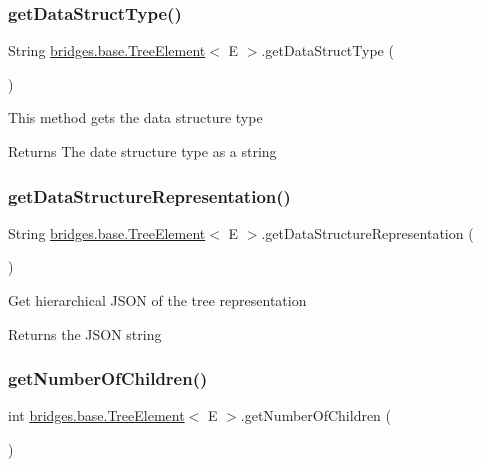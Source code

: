 \subsubsection{\texorpdfstring{getDataStructType()}{getDataStructType()}}
{\footnotesize\ttfamily String \mbox{\hyperlink{classbridges_1_1base_1_1_tree_element}{bridges.\+base.\+Tree\+Element}}$<$ E $>$.get\+Data\+Struct\+Type (\begin{DoxyParamCaption}{ }\end{DoxyParamCaption})}

This method gets the data structure type

\begin{DoxyReturn}{Returns}
The date structure type as a string 
\end{DoxyReturn}
\mbox{\label{classbridges_1_1base_1_1_tree_element_a674870c91b39fac88d35a569fd505e9b}} 
\subsubsection{\texorpdfstring{getDataStructureRepresentation()}{getDataStructureRepresentation()}}
{\footnotesize\ttfamily String \mbox{\hyperlink{classbridges_1_1base_1_1_tree_element}{bridges.\+base.\+Tree\+Element}}$<$ E $>$.get\+Data\+Structure\+Representation (\begin{DoxyParamCaption}{ }\end{DoxyParamCaption})}

Get hierarchical J\+S\+ON of the tree representation

\begin{DoxyReturn}{Returns}
the J\+S\+ON string 
\end{DoxyReturn}
\mbox{\label{classbridges_1_1base_1_1_tree_element_a3722c7cec66ff297f999870df0da3cff}} 
\subsubsection{\texorpdfstring{getNumberOfChildren()}{getNumberOfChildren()}}
{\footnotesize\ttfamily int \mbox{\hyperlink{classbridges_1_1base_1_1_tree_element}{bridges.\+base.\+Tree\+Element}}$<$ E $>$.get\+Number\+Of\+Children (\begin{DoxyParamCaption}{ }\end{DoxyParamCaption})}

